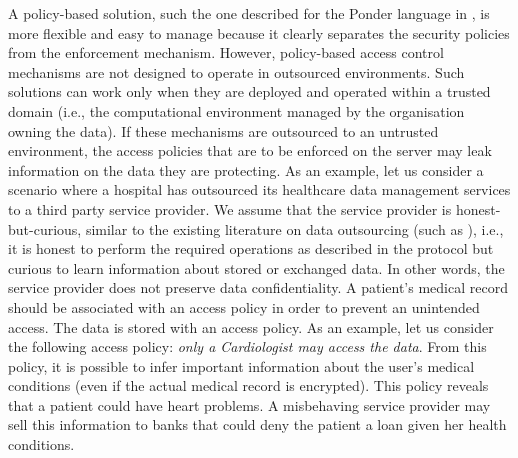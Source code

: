 \documentclass[epsfig,a4paper,11pt,titlepage]{book}
\numberwithin{algorithm}{chapter}
\begin{document}
A policy-based solution, such the one described for the Ponder language in \cite{Russello:2007}, is more flexible and easy to manage because it clearly separates the security policies from the enforcement mechanism. However, policy-based access control mechanisms are not designed to operate in outsourced environments. Such solutions can work only when they are deployed and operated within a trusted domain (i.e., the computational environment managed by the organisation owning the data). If these mechanisms are outsourced to an untrusted environment, the access policies that are to be enforced on the server may leak information on the data they are protecting. As an example, let us consider a scenario where a hospital has outsourced its healthcare data management services to a third party service provider. We assume that the service provider is honest-but-curious, similar to the existing literature on data outsourcing (such as \cite{Vimercati:2007:VLDB}), i.e., it is honest to perform the required operations as described in the protocol but curious to learn information about stored or exchanged data. In other words, the service provider does not preserve data confidentiality. A patient's medical record should be associated with an access policy in order to prevent an unintended access. The data is stored with an access policy. As an example, let us consider the following access policy: \emph{only a Cardiologist may access the data}. From this policy, it is possible to infer important information about the user's medical conditions (even if the actual medical record is encrypted). This policy reveals that a patient could have heart problems. A misbehaving service provider may sell this information to banks that could deny the patient a loan given her health conditions.
\end{document}
